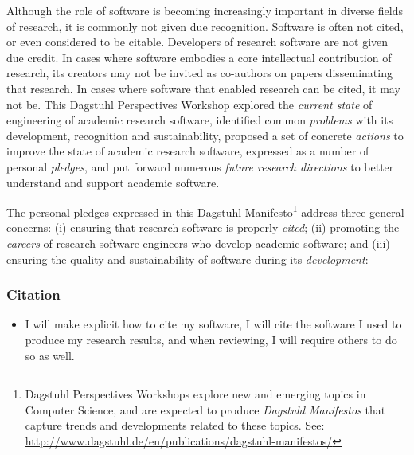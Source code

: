 \documentclass[a4paper,UKenglish]{dagman}
\renewcommand{\paragraph}[1]{\subsubsection*{#1}\xspace}
\begin{document}
Although the role of software is becoming increasingly important in diverse fields of research, it is commonly not given due recognition. Software is often not cited, or even considered to be citable. Developers of research software are not given due credit. In cases where software embodies a core intellectual contribution of research, its creators may not be invited as co-authors on papers disseminating that research. In cases where software that enabled research can be cited, it may not be.  
This Dagstuhl Perspectives Workshop
explored the \emph{current state} of engineering of academic research software,
identified common \emph{problems} with its development, recognition and sustainability,
proposed a set of concrete \emph{actions} to improve the state of academic research software, expressed as a number of personal \emph{pledges},
and
put forward numerous \emph{future research directions} to better understand and support academic software.

The personal pledges expressed in this Dagstuhl Manifesto\footnote{Dagstuhl Perspectives Workshops explore new and emerging topics in Computer Science, and are expected to produce \emph{Dagstuhl Manifestos} that capture trends and developments related to these topics. See: \url{http://www.dagstuhl.de/en/publications/dagstuhl-manifestos/}} address three general concerns:
(i) ensuring that research software is properly \emph{cited};
(ii) promoting the \emph{careers} of research software engineers who develop academic software;
and
(iii) ensuring the quality and sustainability of software during its \emph{development}:

\paragraph{Citation}
\begin{itemize}
\item I will make explicit how to cite my software, I will cite the software I used to produce my research results, and when reviewing, I will require others to do so as well.
\end{itemize}
\end{document}
